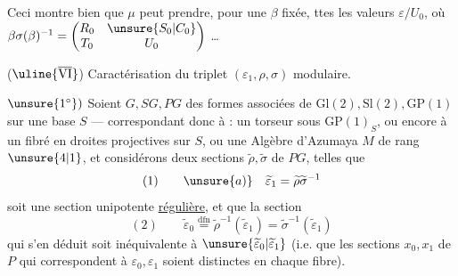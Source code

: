 Ceci montre bien que $\mu$  peut prendre, pour une $\beta$ fixée, ttes les valeurs $\varepsilon/U_0$, où $\beta\sigma(\beta)^{-1}=\begin{pmatrix}R_0&\unsure{S_0|C_0}\\T_0&U_0\end{pmatrix}$ \ldots
{}

($\uline{\overline{\mathrm{VI}}}$) Caractérisation du triplet $(\varepsilon_1,\rho,\sigma)$ modulaire.

$\unsure{1^\circ})$ Soient $G,SG,PG$ des formes associées de $\mathrm{Gl}(2),\mathrm{Sl}(2),\mathrm{GP}(1)$ sur une base $S$ --- correspondant donc à : un torseur sous $\mathrm{GP}(1)_S$, ou encore à un fibré en droites projectives  sur $S$, ou une Algèbre d'Azumaya $M$ de rang $\unsure{4|1}$, et considérons deux sections  $\widetilde\rho,\widetilde\sigma$ de $PG$, telles que
\[
(1)\qquad \unsure{a)}\quad\widetilde\varepsilon_1=\widetilde\rho\widetilde\sigma^{-1}
\]
soit une section unipotente \uline{régulière}, et que la section
\[
(2)\qquad \widetilde\varepsilon_0\overset{\mathrm{dfn}}=\widetilde\rho^{-1}(\widetilde\varepsilon_1)=\widetilde\sigma^{-1}(\widetilde\varepsilon_1)
\]
qui s'en déduit soit   inéquivalente à $\unsure{\widetilde\varepsilon_0|\widetilde\varepsilon_1}$ (i.e. que les sections $x_0,x_1$ de $P$ qui correspondent à $\varepsilon_0,\varepsilon_1$ soient  distinctes en chaque fibre).



